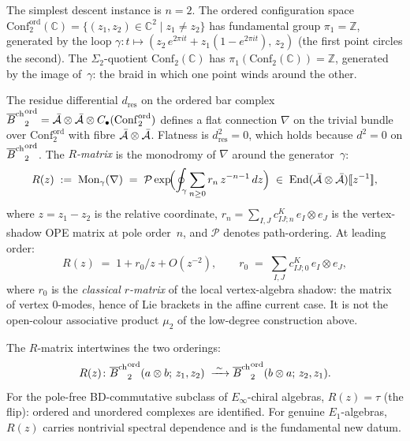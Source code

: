 \begin{construction}
The simplest descent instance is $n=2$. The ordered
configuration space
$\mathrm{Conf}_2^{\mathrm{ord}}(\mathbb C)
=\{(z_1,z_2)\in\mathbb C^2\mid z_1\neq z_2\}$
has fundamental group $\pi_1=\mathbb Z$, generated by the
loop $\gamma\colon t\mapsto
(z_2\,e^{2\pi it}+z_1(1-e^{2\pi it}),\,z_2)$
(the first point circles the second). The $\Sigma_2$-quotient
$\mathrm{Conf}_2(\mathbb C)$ has
$\pi_1(\mathrm{Conf}_2(\mathbb C))=\mathbb Z$, generated by
the image of~$\gamma$: the braid in which one point
winds around the other.

The residue differential $d_{\mathrm{res}}$ on the ordered
bar complex
${\overline{B}^{\mathrm{ch}}}_2^{\mathrm{ord}}=\bar{\mathcal{A}}\otimes\bar{\mathcal{A}}\otimes
C_\bullet(\mathrm{Conf}_2^{\mathrm{ord}})$
defines a flat connection $\nabla$ on the trivial bundle
over $\mathrm{Conf}_2^{\mathrm{ord}}$ with fibre
$\bar{\mathcal{A}}\otimes\bar{\mathcal{A}}$. Flatness is $d_{\mathrm{res}}^2=0$,
which holds because $d^2=0$ on ${\overline{B}^{\mathrm{ch}}}_2^{\mathrm{ord}}$.
The \emph{$R$-matrix} is the monodromy of $\nabla$ around
the generator~$\gamma$:
\begin{equation}%
R(z)
\;:=\;
\operatorname{Mon}_\gamma(\nabla)
\;=\;
\mathcal P\exp\!\Bigl(
\oint_\gamma\sum_{n\ge 0}r_n\,z^{-n-1}\,dz
\Bigr)
\;\in\;
\operatorname{End}(\bar\cA\otimes\bar\cA)[\![z^{-1}]\!],
\end{equation}
where $z=z_1-z_2$ is the relative coordinate,
$r_n=\sum_{I,J}c^K_{IJ;n}\,e_I\otimes e_J$ is the
vertex-shadow OPE matrix at pole order~$n$, and $\mathcal P$ denotes
path-ordering.
At leading order:
\begin{equation}%
R(z)\;=\;1+r_0/z+O(z^{-2}),
\qquad
r_0\;=\;\sum_{I,J}c^K_{IJ;0}\,e_I\otimes e_J,
\end{equation}
where $r_0$ is the \emph{classical $r$-matrix} of the local
vertex-algebra shadow: the matrix of vertex \(0\)-modes, hence of Lie
brackets in the affine current case.  It is not the open-colour
associative product \(\mu_2\) of the low-degree construction above.

The $R$-matrix intertwines the two orderings:
\[
R(z)\colon
{\overline{B}^{\mathrm{ch}}}_2^{\mathrm{ord}}(a\otimes b;\,z_1,z_2)
\;\xrightarrow{\;\sim\;}
{\overline{B}^{\mathrm{ch}}}_2^{\mathrm{ord}}(b\otimes a;\,z_2,z_1).
\]
For the pole-free BD-commutative subclass of
$E_\infty$-chiral algebras, $R(z)=\tau$ (the flip): ordered
and unordered complexes are identified. For genuine
$E_1$-algebras, $R(z)$ carries nontrivial spectral dependence
and is the fundamental new datum.
\end{construction}

